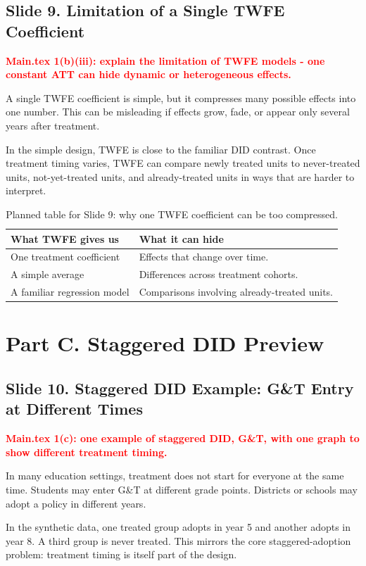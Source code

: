 \documentclass[11pt]{article}
\newcommand{\slideheading}[2]{%
  \subsection*{Slide #1. #2}
}
\newcommand{\slidecontent}[1]{#1}
\newcommand{\mainpoint}[1]{%
  \slidecontent{\textcolor{red}{\textbf{Main.tex #1}}}
}
\begin{document}
\slideheading{9}{Limitation of a Single TWFE Coefficient}
\mainpoint{1(b)(iii): explain the limitation of TWFE models - one constant ATT can hide dynamic or heterogeneous effects.}

\slidecontent{A single TWFE coefficient is simple, but it compresses many
possible effects into one number. This can be misleading if effects grow, fade,
or appear only several years after treatment.}

\slidecontent{In the simple design, TWFE is close to the familiar DID contrast.
Once treatment timing varies, TWFE can compare newly treated units to
never-treated units, not-yet-treated units, and already-treated units in ways
that are harder to interpret.}

\begin{table}[H]
\centering
\small
\begin{tabular}{p{}p{}}
\toprule
\textbf{What TWFE gives us} & \textbf{What it can hide} \\
\midrule
One treatment coefficient & Effects that change over time. \\
A simple average & Differences across treatment cohorts. \\
A familiar regression model & Comparisons involving already-treated units. \\
\bottomrule
\end{tabular}
\caption*{\footnotesize Planned table for Slide 9: why one TWFE coefficient can be too compressed.}
\end{table}

\clearpage

\section*{Part C. Staggered DID Preview}

\slideheading{10}{Staggered DID Example: G\&T Entry at Different Times}
\mainpoint{1(c): one example of staggered DID, G\&T, with one graph to show different treatment timing.}

\slidecontent{In many education settings, treatment does not start for everyone
at the same time. Students may enter G\&T at different grade points. Districts
or schools may adopt a policy in different years.}

\slidecontent{In the synthetic data, one treated group adopts in year 5 and
another adopts in year 8. A third group is never treated. This mirrors the core
staggered-adoption problem: treatment timing is itself part of the design.}
\end{document}
